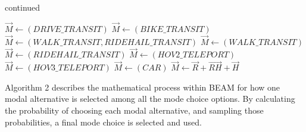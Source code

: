 \documentclass[fancy, masters]{byuthesis}
\begin{document}
\addtocounter{algorithm}{-1}
\begin{algorithm}
\caption{continued}
\begin{algorithmic} [1]
      \State $\vec{M} \gets (DRIVE\_TRANSIT)$
    \Else
      \State $\vec{M} \gets (BIKE\_TRANSIT)$
    \EndIf  
  \Else
    \State $\vec{M} \gets (WALK\_TRANSIT, RIDEHAIL\_TRANSIT)$
  \EndIf
{}  
    \State $\vec{M} \gets (WALK\_TRANSIT)$
  \Else
    \State $\vec{M} \gets (RIDEHAIL\_TRANSIT)$
  \EndIf
{}  
    \State $\vec{M} \gets (HOV2\_TELEPORT)$
  \Else
    \State $\vec{M} \gets (HOV3\_TELEPORT)$
  \EndIf
{}
  \State $\vec{M} \gets (CAR)$
\Else
  \State $\vec{M} \gets \vec{R} + \vec{RH} + \vec{H}$  
\EndIf  
\EndProcedure
\EndFor
\EndFor
\Statex
\end{algorithmic}
\end{algorithm}

Algorithm 2 describes the mathematical process within BEAM for how one modal alternative is selected among all the mode choice options. By calculating the probability of choosing each modal alternative, and sampling those probabilities, a final mode choice is selected and used.
\end{document}
